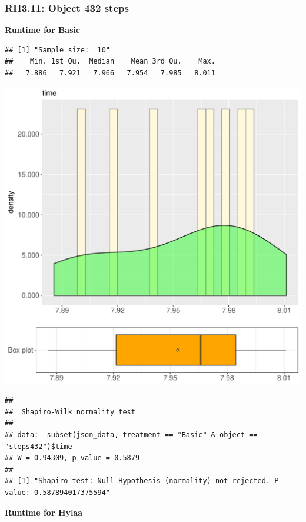 \documentclass{article}\usepackage[]{graphicx}\usepackage[]{color}
\makeatletter
\def\maxwidth{ %
  \ifdim\Gin@nat@width>\linewidth
    \linewidth
  \else
    \Gin@nat@width
  \fi
}
\newenvironment{kframe}{%
 \def\at@end@of@kframe{}%
 \ifinner\ifhmode%
  \def\at@end@of@kframe{\end{minipage}}%
  \begin{minipage}{\columnwidth}%
 \fi\fi%
 \def\FrameCommand##1{\hskip\@totalleftmargin \hskip-\fboxsep
 \colorbox{shadecolor}{##1}\hskip-\fboxsep
     \hskip-\linewidth \hskip-\@totalleftmargin \hskip\columnwidth}%
 \MakeFramed {\advance\hsize-\width
   \@totalleftmargin\z@ \linewidth\hsize
   \@setminipage}}%
 {\par\unskip\endMakeFramed%
 \at@end@of@kframe}
\newenvironment{knitrout}{}{} %
\makeatother
\begin{document}
\subsubsection{RH3.11: Object 432 steps}

 \textbf{Runtime for Basic}
\begin{knitrout}
\color{fgcolor}\begin{kframe}
\begin{verbatim}
## [1] "Sample size:  10"
##    Min. 1st Qu.  Median    Mean 3rd Qu.    Max. 
##   7.886   7.921   7.966   7.954   7.985   8.011
\end{verbatim}
\end{kframe}
\includegraphics[width=\maxwidth]{figure/RH3_Basic_steps432-1} 
\begin{kframe}\begin{verbatim}
## 
## 	Shapiro-Wilk normality test
## 
## data:  subset(json_data, treatment == "Basic" & object == "steps432")$time
## W = 0.94309, p-value = 0.5879
## 
## [1] "Shapiro test: Null Hypothesis (normality) not rejected. P-value: 0.587894017375594"
\end{verbatim}
\end{kframe}
\end{knitrout}
 \textbf{Runtime for Hylaa}
\end{document}
